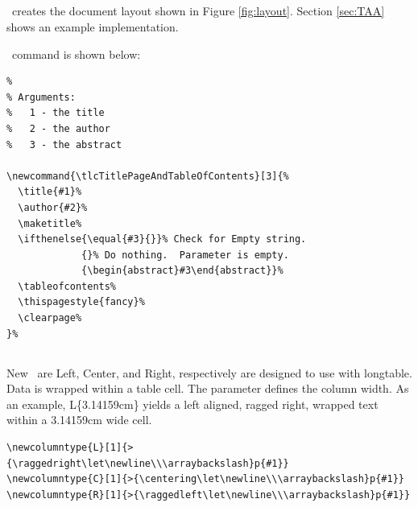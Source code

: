 \documentclass[12pt]{tlc-article}
\begin{document}
\subsection{\tlcTOC}
\tlcTOC\ creates the document layout shown in Figure \ref{fig:layout}.  Section
\ref{sec:TAA} shows an example implementation.

\tlcVspace

\tlcTOC\ command is shown below:

\begin{lstlisting}[basicstyle=\tiny]
% Each document uses the same author name, title page and table of contents.
%
% Arguments:
%   1 - the title
%   2 - the author
%   3 - the abstract

\newcommand{\tlcTitlePageAndTableOfContents}[3]{%
  \title{#1}%
  \author{#2}%
  \maketitle%
  \ifthenelse{\equal{#3}{}}% Check for Empty string.
             {}% Do nothing.  Parameter is empty.
             {\begin{abstract}#3\end{abstract}}%
  \tableofcontents%
  \thispagestyle{fancy}%
  \clearpage%
}%

\end{lstlisting}



\subsection{\tlcNCT}
New \tlcNCT\ are Left, Center, and Right, respectively are
designed to use with longtable.  Data is wrapped within a table cell.   The
parameter defines the column width.  As an example, L\{3.14159cm\} yields a left
aligned, ragged right, wrapped text within a 3.14159cm wide cell.

\tlcVspace

\begin{lstlisting}[basicstyle=\tiny]
\newcolumntype{L}[1]{>{\raggedright\let\newline\\\arraybackslash}p{#1}}
\newcolumntype{C}[1]{>{\centering\let\newline\\\arraybackslash}p{#1}}
\newcolumntype{R}[1]{>{\raggedleft\let\newline\\\arraybackslash}p{#1}}
\end{lstlisting}
\end{document}
